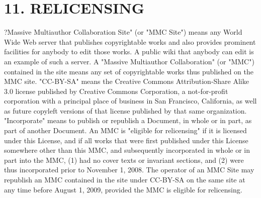 \section{11. RELICENSING}


?Massive Multiauthor Collaboration Site" (or "MMC Site") means any World Wide Web server that publishes copyrightable works and also provides prominent facilities for anybody to edit those works. A public wiki that anybody can edit is an example of such a server. A "Massive Multiauthor Collaboration" (or "MMC") contained in the site means any set of copyrightable works thus published on the MMC site.
"CC-BY-SA" means the Creative Commons Attribution-Share Alike 3.0 license published by Creative Commons Corporation, a not-for-profit corporation with a principal place of business in San Francisco, California, as well as future copyleft versions of that license published by that same organization.
"Incorporate" means to publish or republish a Document, in whole or in part, as part of another Document.
An MMC is "eligible for relicensing" if it is licensed under this License, and if all works that were first published under this License somewhere other than this MMC, and subsequently incorporated in whole or in part into the MMC, (1) had no cover texts or invariant sections, and (2) were thus incorporated prior to November 1, 2008.
The operator of an MMC Site may republish an MMC contained in the site under CC-BY-SA on the same site at any time before August 1, 2009, provided the MMC is eligible for relicensing.




